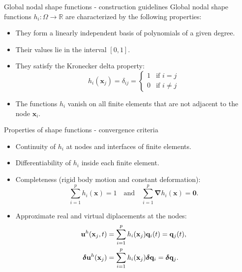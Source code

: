 \documentclass[aspectratio=169]{beamer}
\begin{document}
\begin{frame}{Global nodal shape functions - construction guidelines}
  Global nodal shape functions \( h_i: \Omega \to \mathbb R \) are characterized by the following properties:
  \vspace{0.3cm}
  \begin{itemize}
    \item They form a linearly independent basis of polynomials of a given degree.
    \item Their values lie in the interval \( [0,1] \).
    \item They satisfy the Kronecker delta property:
          \[ h_i(\mathbf{x}_j) = \delta_{ij} = \begin{cases}
              1 & \text{if } i = j    \\
              0 & \text{if } i \neq j
            \end{cases}
          \]
    \item The functions \( h_i \) vanish on all finite elements that are not adjacent to the node \( \mathbf{x}_i \).
  \end{itemize}
\end{frame}

{
\begin{frame}{Properties of shape functions - convergence criteria}
  \begin{block}{}
    \begin{itemize}
      \item Continuity of $h_i$ at nodes and interfaces of finite elements.
      \item Differentiability of $h_i$ inside each finite element.
      \item Completeness (rigid body motion and constant deformation):
            $$\sum_{i=1}^{p}h_{i}(\mathbf x)=1 \quad\text{and}\quad \sum_{i=1}^{p}\boldsymbol\nabla h_{i}(\mathbf x)=\mathbf 0.$$
      \item Approximate real and virtual diplacements at the nodes:
            \begin{align*}
              \mathbf u^h(\mathbf x_j,t)         & =\sum_{i=1}^{p}h_{i}(\mathbf x_j)\mathbf q_{i}(t)=\mathbf q_j(t),               \\
              \boldsymbol\delta\mathbf u^h(\mathbf x_j) & =\sum_{i=1}^{p}h_{i}(\mathbf x_j)\boldsymbol\delta\mathbf q_{i}=\boldsymbol\delta\mathbf q_j.
            \end{align*}
    \end{itemize}
  \end{block}
\end{frame}
}
\end{document}
